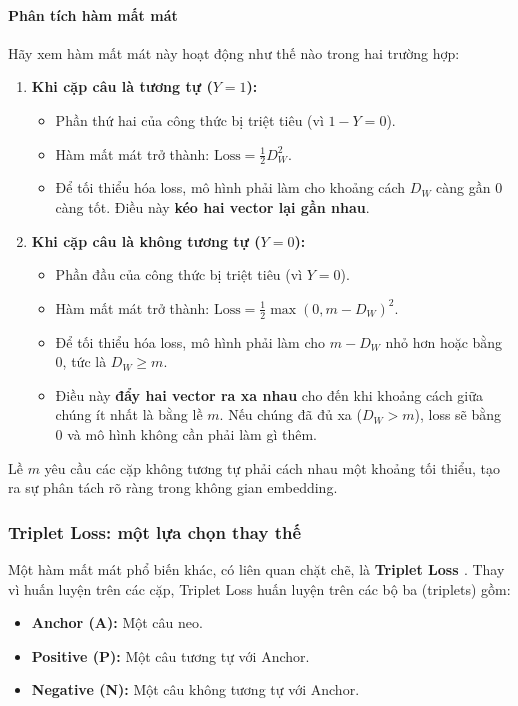 \paragraph{Phân tích hàm mất mát}
Hãy xem hàm mất mát này hoạt động như thế nào trong hai trường hợp:
\begin{enumerate}
    \item \textbf{Khi cặp câu là tương tự ($Y=1$):}
        \begin{itemize}
            \item Phần thứ hai của công thức bị triệt tiêu (vì $1-Y=0$).
            \item Hàm mất mát trở thành: $\text{Loss} = \frac{1}{2} D_W^2$.
            \item Để tối thiểu hóa loss, mô hình phải làm cho khoảng cách $D_W$ càng gần 0 càng tốt. Điều này \textbf{kéo hai vector lại gần nhau}.
        \end{itemize}
    \item \textbf{Khi cặp câu là không tương tự ($Y=0$):}
        \begin{itemize}
            \item Phần đầu của công thức bị triệt tiêu (vì $Y=0$).
            \item Hàm mất mát trở thành: $\text{Loss} = \frac{1}{2} \max(0, m - D_W)^2$.
            \item Để tối thiểu hóa loss, mô hình phải làm cho $m - D_W$ nhỏ hơn hoặc bằng 0, tức là $D_W \geq m$.
            \item Điều này \textbf{đẩy hai vector ra xa nhau} cho đến khi khoảng cách giữa chúng ít nhất là bằng lề $m$. Nếu chúng đã đủ xa ($D_W > m$), loss sẽ bằng 0 và mô hình không cần phải làm gì thêm.
        \end{itemize}
\end{enumerate}
Lề $m$ yêu cầu các cặp không tương tự phải cách nhau một khoảng tối thiểu, tạo ra sự phân tách rõ ràng trong không gian embedding.

\subsubsection{Triplet Loss: một lựa chọn thay thế}
\label{ssec:triplet_loss}

Một hàm mất mát phổ biến khác, có liên quan chặt chẽ, là \textbf{Triplet Loss \cite{schroff2015facenet}}. Thay vì huấn luyện trên các cặp, Triplet Loss huấn luyện trên các bộ ba (triplets) gồm:
\begin{itemize}
    \item \textbf{Anchor (A):} Một câu neo.
    \item \textbf{Positive (P):} Một câu tương tự với Anchor.
    \item \textbf{Negative (N):} Một câu không tương tự với Anchor.
\end{itemize}


